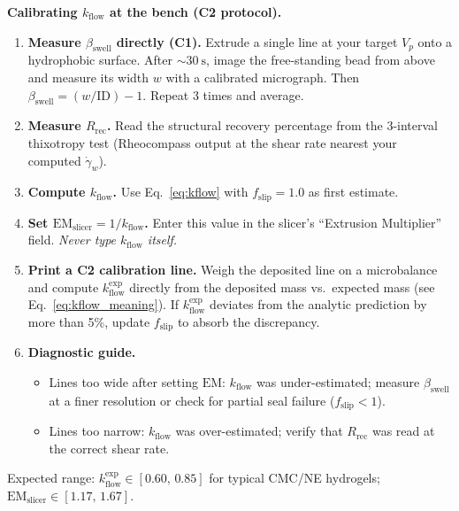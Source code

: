 \documentclass[11pt,a4paper]{article}
\newcommand{\gd}{\dot{\gamma}}
\begin{document}
\begin{inpracticebox}
\textbf{Calibrating $k_\mathrm{flow}$ at the bench (C2 protocol).}
\begin{enumerate}[leftmargin=1.6em,itemsep=3pt]
\item \textbf{Measure $\beta_\mathrm{swell}$ directly (C1).} Extrude a
  single line at your target $V_p$ onto a hydrophobic surface. After
  $\sim\SI{30}{\s}$, image the free-standing bead from above and measure
  its width $w$ with a calibrated micrograph. Then
  $\beta_\mathrm{swell}=(w/\mathrm{ID})-1$. Repeat 3 times and average.
\item \textbf{Measure $R_\mathrm{rec}$.} Read the structural recovery
  percentage from the 3-interval thixotropy test (Rheocompass output at
  the shear rate nearest your computed $\gd_w$).
\item \textbf{Compute $k_\mathrm{flow}$.} Use Eq.~\ref{eq:kflow} with
  $f_\mathrm{slip}=1.0$ as first estimate.
\item \textbf{Set $\mathrm{EM}_\mathrm{slicer}=1/k_\mathrm{flow}$.}
  Enter this value in the slicer's ``Extrusion Multiplier'' field.
  \emph{Never type $k_\mathrm{flow}$ itself.}
\item \textbf{Print a C2 calibration line.} Weigh the deposited line on
  a microbalance and compute $k_\mathrm{flow}^\mathrm{exp}$ directly
  from the deposited mass vs.\ expected mass (see Eq.~\ref{eq:kflow_meaning}).
  If $k_\mathrm{flow}^\mathrm{exp}$ deviates from the analytic prediction
  by more than 5\%, update $f_\mathrm{slip}$ to absorb the discrepancy.
\item \textbf{Diagnostic guide.}
  \begin{itemize}[leftmargin=1.2em,itemsep=1pt]
  \item Lines too wide after setting $\mathrm{EM}$: $k_\mathrm{flow}$ was
    under-estimated; measure $\beta_\mathrm{swell}$ at a finer resolution
    or check for partial seal failure ($f_\mathrm{slip}<1$).
  \item Lines too narrow: $k_\mathrm{flow}$ was over-estimated; verify
    that $R_\mathrm{rec}$ was read at the correct shear rate.
  \end{itemize}
\end{enumerate}
Expected range: $k_\mathrm{flow}^\mathrm{exp}\in[0.60,\,0.85]$ for typical
CMC/NE hydrogels; $\mathrm{EM}_\mathrm{slicer}\in[1.17,\,1.67]$.
\end{inpracticebox}

\end{document}
